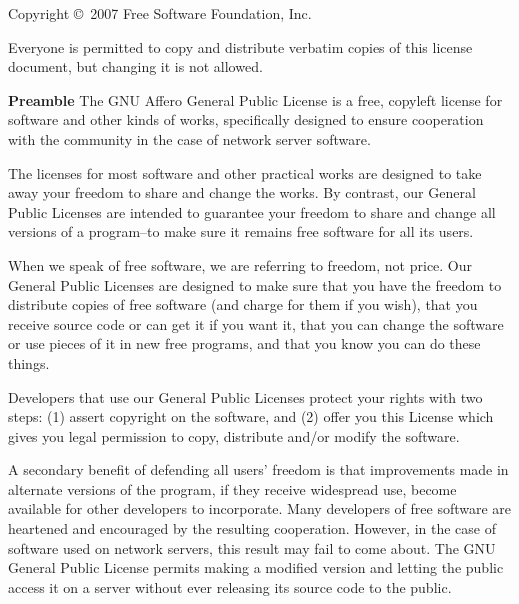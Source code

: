 

\blank
Copyright \copyright\  2007 Free Software Foundation, Inc. 

\bigskip
Everyone is permitted to copy and distribute verbatim copies of this license document, but changing it is not allowed.

{\bf Preamble}
The GNU Affero General Public License is a free, copyleft license for software and other kinds of works, specifically designed to ensure cooperation with the community in the case of network server software.

The licenses for most software and other practical works are designed to take away your freedom to share and change the works.  By contrast, our General Public Licenses are intended to guarantee your freedom to share and change all versions of a program--to make sure it remains free software for all its users.

When we speak of free software, we are referring to freedom, not price.  Our General Public Licenses are designed to make sure that you have the freedom to distribute copies of free software (and charge for them if you wish), that you receive source code or can get it if you want it, that you can change the software or use pieces of it in new free programs, and that you know you can do these things.

Developers that use our General Public Licenses protect your rights with two steps: (1) assert copyright on the software, and (2) offer you this License which gives you legal permission to copy, distribute and/or modify the software.

A secondary benefit of defending all users' freedom is that improvements made in alternate versions of the program, if they receive widespread use, become available for other developers to incorporate.  Many developers of free software are heartened and encouraged by the resulting cooperation.  However, in the case of software used on network servers, this result may fail to come about. The GNU General Public License permits making a modified version and letting the public access it on a server without ever releasing its source code to the public.

